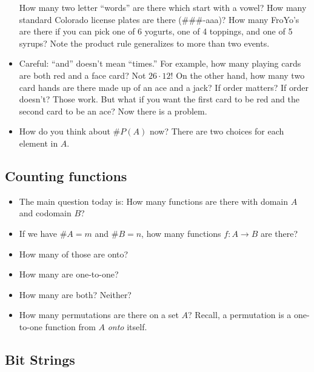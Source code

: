 \begin{itemize}
\ex How many two letter ``words'' are there which start with a vowel?  How many standard Colorado license plates are there (\#\#\#-aaa)?  How many FroYo's are there if you can pick one of 6 yogurts, one of 4 toppings, and one of 5 syrups?  Note the product rule generalizes to more than two events.

\item Careful: ``and'' doesn't mean ``times.''  For example, how many playing cards are both red and a face card?  Not $26 \cdot 12$!  On the other hand, how many two card hands are there made up of an ace and a jack?  If order matters?  If order doesn't?  Those work.  But what if you want the first card to be red and the second card to be an ace?  Now there is a problem.

\item How do you think about $\#P(A)$ now? There are two choices for each element in $A$.

\end{itemize}

\subsection*{Counting functions}
\begin{itemize}
\item The main question today is: How many functions are there with domain $A$ and codomain $B$?
\item If we have $\#A = m$ and $\#B = n$, how many functions $f: A \to B$ are there?
\item How many of those are onto?
\item How many are one-to-one?
\item How many are both?  Neither?
\item How many permutations are there on a set $A$?  Recall, a permutation is a one-to-one function from $A$ {\em onto} itself.
\end{itemize}




\subsection*{Bit Strings}

